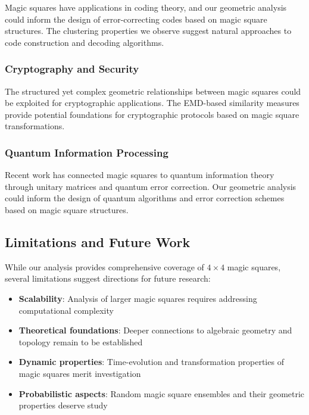 Magic squares have applications in coding theory, and our geometric analysis could inform the design of error-correcting codes based on magic square structures. The clustering properties we observe suggest natural approaches to code construction and decoding algorithms.

\subsubsection{Cryptography and Security}

The structured yet complex geometric relationships between magic squares could be exploited for cryptographic applications. The EMD-based similarity measures provide potential foundations for cryptographic protocols based on magic square transformations.

\subsubsection{Quantum Information Processing}

Recent work has connected magic squares to quantum information theory through unitary matrices and quantum error correction. Our geometric analysis could inform the design of quantum algorithms and error correction schemes based on magic square structures.

\subsection{Limitations and Future Work}

While our analysis provides comprehensive coverage of $4 \times 4$ magic squares, several limitations suggest directions for future research:

\begin{itemize}
    \item \textbf{Scalability}: Analysis of larger magic squares requires addressing computational complexity
    \item \textbf{Theoretical foundations}: Deeper connections to algebraic geometry and topology remain to be established
    \item \textbf{Dynamic properties}: Time-evolution and transformation properties of magic squares merit investigation
    \item \textbf{Probabilistic aspects}: Random magic square ensembles and their geometric properties deserve study
\end{itemize}

